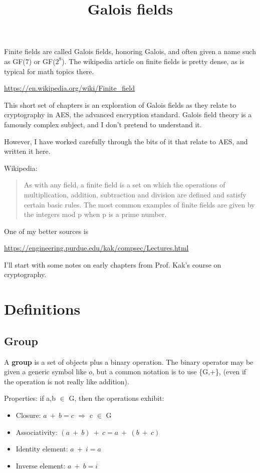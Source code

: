 \documentclass[11pt, oneside]{article}
\title{Galois fields}
\date{}
\begin{document}
\maketitle
\Large
Finite fields are called Galois fields, honoring Galois, and often given a name such as GF($7$) or GF($2^8$).  The wikipedia article on finite fields is pretty dense, as is typical for math topics there.

\url{https://en.wikipedia.org/wiki/Finite_field}

This short set of chapters is an exploration of Galois fields as they relate to cryptography in AES, the advanced encryption standard.  Galois field theory is a famously complex subject, and I don't pretend to understand it.  

However, I have worked carefully through the bits of it that relate to AES, and written it here.

Wikipedia:

\begin{quote}As with any field, a finite field is a set on which the operations of multiplication, addition, subtraction and division are defined and satisfy certain basic rules. The most common examples of finite fields are given by the integers mod p when p is a prime number.\end{quote}

One of my better sources is

\url{https://engineering.purdue.edu/kak/compsec/Lectures.html}

I'll start with some notes on early chapters from Prof. Kak's course on cryptography.

\section*{Definitions}

\subsection*{Group}

A \textbf{group} is a set of objects plus a binary operation.  The binary operator may be given a generic symbol like $o$, but a common notation is to use \{G,+\}, (even if the operation is not really like addition). 

Properties:  if a,b $\in$ G, then the operations exhibit:
\begin{itemize}
\item Closure:           $a \ + \ b = c$ $\Rightarrow$ c $\in$ G
\item Associativity:    $(a \ + \ b) \ + \ c = a \ + \ (b \ + \ c)$
\item Identity element:  $a \ + \ i = a$
\item Inverse element:   $a \ + \ b = i$
\end{itemize}
\end{document}
